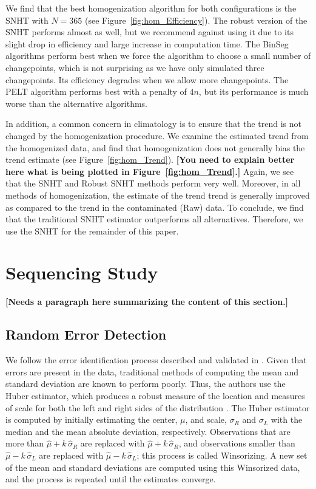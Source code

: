 \documentclass[12pt]{article}
\begin{document}
\begin{doublespacing}
We find that the best homogenization algorithm for both configurations is the SNHT with $N=365$ (see Figure~\ref{fig:hom_Efficiency}).  The robust version of the SNHT performs almost as well, but we recommend against using it due to its slight drop in efficiency and large increase in computation time.  The BinSeg algorithms perform best when we force the algorithm to choose a small number of changepoints, which is not surprising as we have only simulated three changepoints.  Its efficiency degrades when we allow more changepoints.  The PELT algorithm performs best with a penalty of $4n$, but its performance is much worse than the alternative algorithms.

In addition, a common concern in climatology is to ensure that the trend is not changed by the homogenization procedure.  We examine the estimated trend from the homogenized data, and find that homogenization does not generally bias the trend estimate (see Figure~\ref{fig:hom_Trend}). \textbf{[You need to explain better here what is being plotted in Figure~\ref{fig:hom_Trend}.]}  Again, we see that the SNHT and Robust SNHT methods perform very well.  Moreover, in all methods of homogenization, the estimate of the trend trend is generally improved as compared to the trend in the contaminated (Raw) data.  To conclude, we find that the traditional SNHT estimator outperforms all alternatives.  Therefore, we use the SNHT  for the remainder of this paper.

\section{Sequencing Study}

\textbf{[Needs a paragraph here summarizing the content of this section.]}









\subsection{Random Error Detection}
We follow the error identification process described and validated in \cite{bell14}.  Given that errors are present in the data, traditional methods of computing the mean and standard deviation are known to perform poorly.  Thus, the authors use the Huber estimator, which produces a robust measure of the location and measures of scale for both the left and right sides of the distribution \cite{huber11}. The Huber estimator is computed by initially estimating  the center, $\mu$, and scale, $\sigma_R$ and $\sigma_L$ with the median and the mean absolute deviation, respectively.  Observations that are more than $\hat\mu+k \,\hat\sigma_R$ are replaced with $\hat\mu+k\, \hat\sigma_R$, and observations smaller than $\hat\mu-k\, \hat\sigma_L$ are replaced with $\hat\mu-k \,\hat\sigma_L$; this process is called Winsorizing.  A new set of the mean and standard deviations are computed using this Winsorized data, and the process is repeated until the estimates converge.  


\end{doublespacing}
\end{document}

